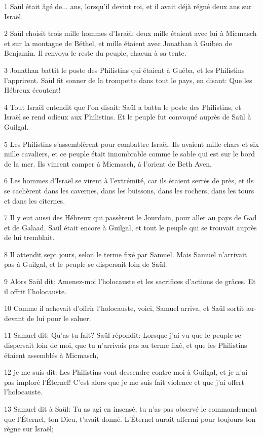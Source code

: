 \par 1 Saül était âgé de... ans, lorsqu'il devint roi, et il avait déjà régné deux ans sur Israël.
\par 2 Saül choisit trois mille hommes d'Israël: deux mille étaient avec lui à Micmasch et sur la montagne de Béthel, et mille étaient avec Jonathan à Guibea de Benjamin. Il renvoya le reste du peuple, chacun à sa tente.
\par 3 Jonathan battit le poste des Philistins qui étaient à Guéba, et les Philistins l'apprirent. Saül fit sonner de la trompette dans tout le pays, en disant: Que les Hébreux écoutent!
\par 4 Tout Israël entendit que l'on disait: Saül a battu le poste des Philistins, et Israël se rend odieux aux Philistins. Et le peuple fut convoqué auprès de Saül à Guilgal.
\par 5 Les Philistins s'assemblèrent pour combattre Israël. Ils avaient mille chars et six mille cavaliers, et ce peuple était innombrable comme le sable qui est sur le bord de la mer. Ils vinrent camper à Micmasch, à l'orient de Beth Aven.
\par 6 Les hommes d'Israël se virent à l'extrémité, car ils étaient serrés de près, et ils se cachèrent dans les cavernes, dans les buissons, dans les rochers, dans les tours et dans les citernes.
\par 7 Il y eut aussi des Hébreux qui passèrent le Jourdain, pour aller au pays de Gad et de Galaad. Saül était encore à Guilgal, et tout le peuple qui se trouvait auprès de lui tremblait.
\par 8 Il attendit sept jours, selon le terme fixé par Samuel. Mais Samuel n'arrivait pas à Guilgal, et le peuple se dispersait loin de Saül.
\par 9 Alors Saül dit: Amenez-moi l'holocauste et les sacrifices d'actions de grâces. Et il offrit l'holocauste.
\par 10 Comme il achevait d'offrir l'holocauste, voici, Samuel arriva, et Saül sortit au-devant de lui pour le saluer.
\par 11 Samuel dit: Qu'as-tu fait? Saül répondit: Lorsque j'ai vu que le peuple se dispersait loin de moi, que tu n'arrivais pas au terme fixé, et que les Philistins étaient assemblés à Micmasch,
\par 12 je me suis dit: Les Philistins vont descendre contre moi à Guilgal, et je n'ai pas imploré l'Éternel! C'est alors que je me suis fait violence et que j'ai offert l'holocauste.
\par 13 Samuel dit à Saül: Tu as agi en insensé, tu n'as pas observé le commandement que l'Éternel, ton Dieu, t'avait donné. L'Éternel aurait affermi pour toujours ton règne sur Israël;
